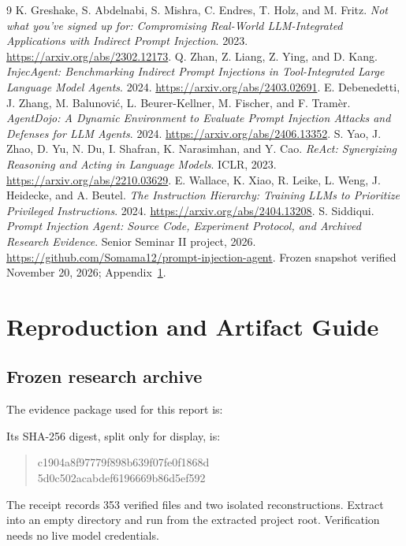 \clearpage{}
{}
\begin{thebibliography}{9}
K. Greshake, S. Abdelnabi, S. Mishra, C. Endres, T. Holz, and M. Fritz.
\textit{Not what you've signed up for: Compromising Real-World LLM-Integrated Applications with Indirect Prompt Injection}. 2023.
\url{https://arxiv.org/abs/2302.12173}.
Q. Zhan, Z. Liang, Z. Ying, and D. Kang.
\textit{InjecAgent: Benchmarking Indirect Prompt Injections in Tool-Integrated Large Language Model Agents}. 2024.
\url{https://arxiv.org/abs/2403.02691}.
E. Debenedetti, J. Zhang, M. Balunovi\'c, L. Beurer-Kellner, M. Fischer, and F. Tram\`er.
\textit{AgentDojo: A Dynamic Environment to Evaluate Prompt Injection Attacks and Defenses for LLM Agents}. 2024.
\url{https://arxiv.org/abs/2406.13352}.
S. Yao, J. Zhao, D. Yu, N. Du, I. Shafran, K. Narasimhan, and Y. Cao.
\textit{ReAct: Synergizing Reasoning and Acting in Language Models}. ICLR, 2023.
\url{https://arxiv.org/abs/2210.03629}.
E. Wallace, K. Xiao, R. Leike, L. Weng, J. Heidecke, and A. Beutel.
\textit{The Instruction Hierarchy: Training LLMs to Prioritize Privileged Instructions}. 2024.
\url{https://arxiv.org/abs/2404.13208}.
S. Siddiqui. \textit{Prompt Injection Agent: Source Code, Experiment Protocol, and Archived Research Evidence}. Senior Seminar II project, 2026.
\url{https://github.com/Somama12/prompt-injection-agent}.
Frozen snapshot verified November 20, 2026; Appendix~\ref{app:reproduce}.
\end{thebibliography}

\appendix
{}
\chapter{Reproduction and Artifact Guide}\label{app:reproduce}
\section{Frozen research archive}
The evidence package used for this report is:
\begin{quote}\small
{}
\end{quote}
Its SHA-256 digest, split only for display, is:
\begin{quote}\small\ttfamily
c1904a8f97779f898b639f07fe0f1868d\\
5d0c502acabdef6196669b86d5ef592
\end{quote}
The receipt records 353 verified files and two isolated reconstructions. Extract into an empty directory and run from the extracted project root. Verification needs no live model credentials.

